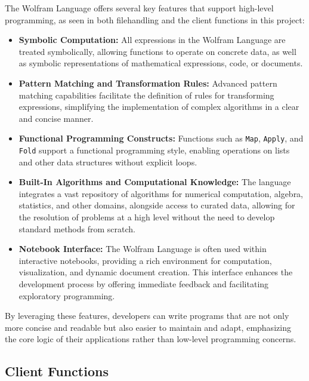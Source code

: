 The Wolfram Language offers several key features that support high-level programming, as seen in both filehandling and the client functions in this project:

\begin{itemize}
    \item \textbf{Symbolic Computation:} All expressions in the Wolfram Language are treated symbolically, allowing functions to operate on concrete data, as well as symbolic representations of mathematical expressions, code, or documents.
    
    \item \textbf{Pattern Matching and Transformation Rules:} Advanced pattern matching capabilities facilitate the definition of rules for transforming expressions, simplifying the implementation of complex algorithms in a clear and concise manner.
    
    \item \textbf{Functional Programming Constructs:} Functions such as \texttt{Map}, \texttt{Apply}, and \texttt{Fold} support a functional programming style, enabling operations on lists and other data structures without explicit loops.
    
    \item \textbf{Built-In Algorithms and Computational Knowledge:} The language integrates a vast repository of algorithms for numerical computation, algebra, statistics, and other domains, alongside access to curated data, allowing for the resolution of problems at a high level without the need to develop standard methods from scratch.
    
    \item \textbf{Notebook Interface:} The Wolfram Language is often used within interactive notebooks, providing a rich environment for computation, visualization, and dynamic document creation. This interface enhances the development process by offering immediate feedback and facilitating exploratory programming.
\end{itemize}

By leveraging these features, developers can write programs that are not only more concise and readable but also easier to maintain and adapt, emphasizing the core logic of their applications rather than low-level programming concerns.

\subsection{Client Functions}

